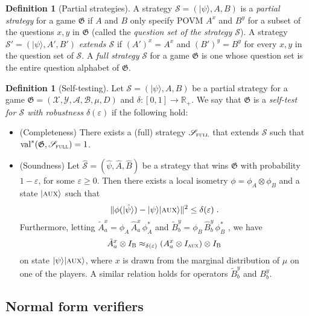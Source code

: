 \documentclass[11pt]{article}
\theoremstyle{definition}
\newtheorem{definition}[theorem]{Definition}
\newcommand{\ket}[1]{|#1\rangle}
\newcommand{\Id}{\ensuremath{I}}
\newcommand{\R}{\ensuremath{\mathbb{R}}}
\newcommand{\val}{\ensuremath{\mathrm{val}}}
\newcommand{\eps}{\varepsilon}
\newcommand{\game}{\mathfrak{G}}
\newcommand{\strategy}{\mathscr{S}}
\newcommand{\labelstyle}[1]{\ensuremath{\textsc{#1}}\xspace}
\newcommand{\aux}{\labelstyle{aux}}
\newcommand{\full}{\labelstyle{full}}
\newcommand{\bob}{\labelstyle{B}}
\renewcommand{\cal}[1]{\mathcal{#1}}
\begin{document}
\begin{definition}[Partial strategies]
  A strategy $\strategy = (\ket{\psi}, A, B)$ is a \emph{partial strategy} for a
  game $\game$ if $A$ and $B$ only specify POVM $A^x$ and $B^y$ for a subset of
  the questions $x, y$ in $\game$ (called the \emph{question set of the strategy
    $\strategy$}).
  A strategy $\strategy' = (\ket{\psi}, A', B')$ \emph{extends $\strategy$} if
  $(A')^x = A^x$ and $(B')^y = B^y$ for every $x, y$ in the question set of
  $\strategy$.
  A \emph{full strategy} $\strategy$ for a game $\game$ is one whose question
  set is the entire question alphabet of $\game$.
\end{definition}

\begin{definition}[Self-testing]
  Let $\strategy = (\ket{\psi}, A, B)$ be a partial strategy for a game $\game =
  (\cal{X}, \cal{Y}, \cal{A}, \cal{B}, \mu, D)$ and $\delta:[0,1]\to \R_+$.
  We say that $\game$ is a \emph{self-test for $\strategy$ with robustness
    $\delta(\eps)$} if the following hold:
  \begin{itemize}
	\item (Completeness)
    There exists a (full) strategy $\strategy_{\full}$ that extends $\strategy$
    such that $\val^*(\game, \strategy_{\full}) = 1$.
	\item (Soundness)
    Let $\hat{\strategy} = (\hat{\psi}, \hat{A}, \hat{B})$ be a strategy that
    wins $\game$ with probability $1 - \eps$, for some $\eps\geq 0$.
    Then there exists a local isometry $\phi = \phi_A \otimes \phi_B$ and a
    state $\ket{\aux}$ such that
    \begin{equation*}
      \| \phi (\ket{\hat{\psi}}) - \ket{\psi} \ket{\aux} \|^2 \leq \delta(\eps)\;.
    \end{equation*}
    Furthermore, letting $\tilde{A}^x_a = \phi_A\, \hat{A}^x_a\, \phi_A^*$ and
    $\tilde{B}^y_b = \phi_B\, \hat{B}^y_b\, \phi_B^*$ , we have
    \begin{equation*}
      \tilde{A}^x_a \otimes I_\bob \approx_{\delta(\eps)}
      (A^x_a \otimes \Id_\aux) \otimes I_\bob
    \end{equation*}
    on state $\ket{\psi} \ket{\aux}$, where $x$ is drawn from the
    marginal distribution of $\mu$ on one of the players.
    A similar relation holds for operators $\tilde{B}^y_b$ and $B^y_b$.
  \end{itemize}
\end{definition}


\subsection{Normal form verifiers}
\label{sec:normal-form}
\end{document}
